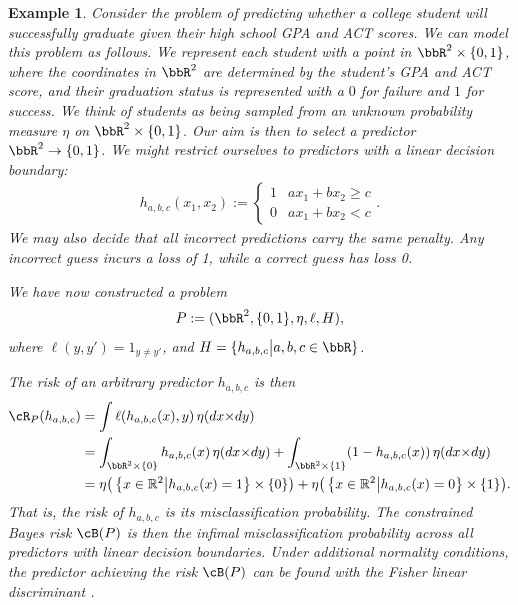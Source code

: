 \documentclass[twoside,11pt]{article}
\newtheorem{examples}[theorem]{Example}
\newcommand{\set}[2]{\left\{ #1\middle| #2\right\}}
\begin{document}
\begin{examples}\label{ex:linear-classification}
Consider the problem of predicting whether a college student will successfully graduate given their high school GPA and ACT scores. We can model this problem as follows. We represent each student with a point in $\bbR^2 \times \{0,1\}$, where the coordinates in $\bbR^2$ are determined by the student's GPA and ACT score, and their graduation status is represented with a $0$ for failure and $1$ for success. We think of students as being sampled from an unknown probability measure $\eta$ on $\bbR^2 \times \{0,1\}$. Our aim is then to select a predictor $\bbR^2\to \{0,1\}$. We might restrict ourselves to predictors with a linear decision boundary:
\begin{align*}
    h_{a,b,c}(x_1,x_2) := \begin{cases}
    1 & ax_1 + bx_2 \geq c \\
    0 & ax_1 + bx_2 < c
    \end{cases}.
\end{align*}
We may also decide that all incorrect predictions carry the same penalty. Any incorrect guess incurs a loss of 1, while a correct guess has loss 0.

We have now constructed a problem
\[P := (\bbR^2,\{0,1\},\eta,\ell,H),\]
where $\ell(y,y') = 1_{y\neq y'}$, and $H = \{h_{a,b,c}\big| a,b,c\in \bbR\}$.

The risk of an arbitrary predictor $h_{a,b,c}$ is then
\begin{align*}
    \cR_P(h_{a,b,c}) & = \int \ell(h_{a,b,c}(x),y) \,\eta(dx{\times}dy)
    \\ & =
    \int_{\bbR^2 \times \{0\}} h_{a,b,c}(x) \, \eta(dx{\times}dy)
    +
    \int_{\bbR^2 \times \{1\}} (1-h_{a,b,c}(x)) \, \eta(dx{\times}dy)
    \\ & =
    \eta\big(\set{x\in \mathbb R^2}{h_{a,b,c}(x)=1} \times \{0\}\big)
    +\eta\big(\set{x\in \mathbb R^2}{h_{a,b,c}(x)=0} \times \{1\}\big).
\end{align*}
That is, the risk of $h_{a,b,c}$ is its misclassification probability. The constrained Bayes risk $\cB(P)$ is then the infimal misclassification probability across all predictors with linear decision boundaries. Under additional normality conditions, the predictor achieving the risk $\cB(P)$ can be found with the Fisher linear discriminant \citep{fisher_use_1936}.


\end{examples}
\end{document}
